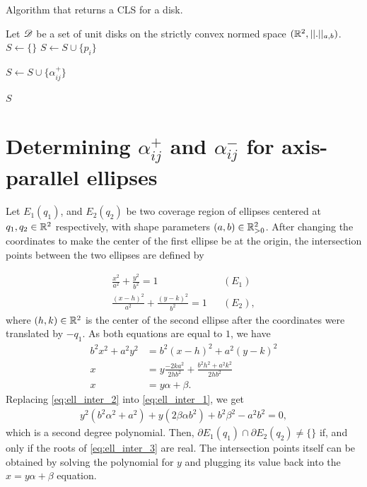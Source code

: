 \begin{algoritmo}
	\caption{Algorithm that returns a CLS for a disk.}\label{algoritmo:mce_cls}
	\begin{algorithmic}[1]
		
		\item[]
		
		\State Let $\mathscr{D}$ be a set of unit disks on the strictly convex normed space $(\mathbb{R}^2, ||.||_{a,b})$.
		\State $S \gets \{\}$
		\State $S \gets S \cup \{p_i\}$
		

		\State $S \gets S \cup \{\alpha_{ij}^+\}$	

		\EndFor
		\EndFor
		
		\State \Return $S$
		\EndProcedure
	\end{algorithmic}
\end{algoritmo}

\section{Determining $\alpha_{ij}^+$ and $\alpha_{ij}^-$ for axis-parallel ellipses}\label{section:ellipses_intersection2}

Let $E_1(q_1)$, and $E_2(q_2)$ be two coverage region of ellipses centered at $q_1, q_2\in\mathbb{R}^2$ respectively, with shape parameters $(a, b)\in\mathbb{R}^2_{>0}$. After changing the coordinates to make the center of the first ellipse be at the origin, the intersection points between the two ellipses are defined by

\begin{align}
	\frac{x^2}{a^2} + \frac{y^2}{b^2} = 1 && (E_1) \label{eq:ell_inter_1}\\
	\frac{(x-h)^2}{a^2} + \frac{(y-k)^2}{b^2} = 1 && (E_2), \nonumber
\end{align}
where $(h,k)\in\mathbb{R}^2$ is the center of the second ellipse after the coordinates were translated by $-q_1$. As both equations are equal to $1$, we have
\begin{align}
	b^2x^2 + a^2y^2 &= b^2(x-h)^2 + a^2(y-k)^2 \nonumber\\
	x &= y\frac{-2ka^2}{2hb^2} + \frac{b^2h^2 + a^2k^2}{2hb^2} \nonumber\\
	x &= y\alpha + \beta.\label{eq:ell_inter_2}
\end{align}
Replacing \autoref{eq:ell_inter_2} into \autoref{eq:ell_inter_1}, we get
\begin{align}\label{eq:ell_inter_3}
	y^2(b^2\alpha^2 + a^2) + y(2\beta\alpha b^2) + b^2\beta^2 -a^2b^2 = 0,
\end{align}
which is a second degree polynomial. Then, $\partial E_1(q_1) \cap \partial E_2(q_2) \neq \{\}$ if, and only if the roots of \autoref{eq:ell_inter_3} are real. The intersection points itself can be obtained by solving the polynomial for $y$ and plugging its value back into the $x=y\alpha + \beta$ equation.

